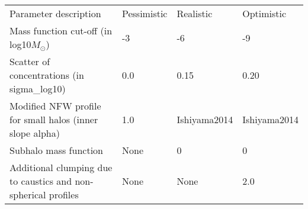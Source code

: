\begin{table}
    \begin{tabular}{llll}
    Parameter description                                    & Pessimistic & Realistic & Optimistic \hline \hline \\
    Mass function cut-off (in log10$M_\odot$)        & -3 & -6 & -9 \\
    Scatter of concentrations (in sigma\_log10)              & 0.0 & 0.15 & 0.20 \\
    Modified NFW profile for small halos (inner slope alpha) & 1.0 & Ishiyama2014 & Ishiyama2014 \\
    Subhalo mass function & None & 0 & 0 \\
    Additional clumping due to caustics and non-spherical profiles & None & None & 2.0
\\    \end{tabular}
\end{table}